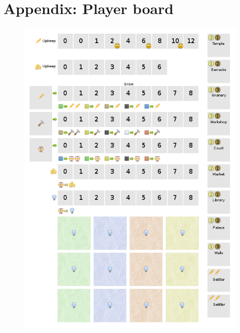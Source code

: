 \documentclass[11pt,a4paper,titlepage]{article}
\begin{document}
\section{Appendix: Player board}{
  \begin{figure}[!htb]
    \includegraphics[scale=.6]{doe_player_board.png}
    \captionsetup{labelformat=empty}
    \caption{}
    \label{fig:game_board}
  \end{figure}
}\label{sec:player_board}

\newpage
\end{document}
